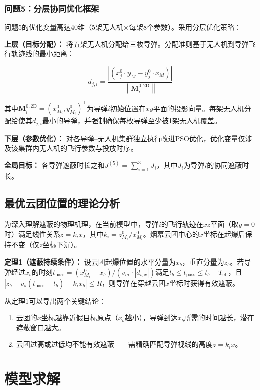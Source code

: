 \documentclass[12pt,a4paper]{ctexart}
\newcommand{\abs}[1]{\left| #1 \right|}
\newcommand{\norm}[1]{\left\| #1 \right\|}
\newcommand{\vect}[1]{\boldsymbol{#1}}
\begin{document}
\subsubsection{问题5：分层协同优化框架}

问题5的优化变量高达40维（5架无人机$\times$每架8个参数）。采用分层优化策略：

\textbf{上层（目标分配）：} 将五架无人机分配给三枚导弹。分配准则基于无人机到导弹飞行轨迹线的最小距离：

\begin{equation}\label{eq:assign}
d_{j,i} = \frac{\abs{(x_j^0 \cdot y_M - y_j^0 \cdot x_M)}}{\norm{\vect{M}_i^{0,\text{2D}}}}
\end{equation}

其中$\vect{M}_i^{0,\text{2D}} = (x_{M_i}^0, y_{M_i}^0)^\top$为导弹$i$初始位置在$xy$平面的投影向量。每架无人机分配给使其$d_{j,i}$最小的导弹，并强制确保每枚导弹至少被1架无人机覆盖。

\textbf{下层（参数优化）：} 对各导弹--无人机集群独立执行改进PSO优化，优化变量仅涉及该集群内无人机的飞行参数与投放时序。

\textbf{全局目标：} 各导弹遮蔽时长之和$J^{(5)} = \sum_{i=1}^{3} J_i$，其中$J_i$为导弹$i$的协同遮蔽时长。

\subsection{最优云团位置的理论分析}

为深入理解遮蔽的物理机理，在当前模型中，导弹$i$的飞行轨迹在$xz$平面（取$y=0$时）满足线性关系$z = k_i x$，其中$k_i = z_{M_i}^0 / x_{M_i}^0$。烟幕云团中心的$x$坐标在起爆后保持不变（仅$z$坐标下沉）。

\textbf{定理1（遮蔽持续条件）：} 设云团起爆位置的水平分量为$x_b$，垂直分量为$z_b$。若导弹经过$x_b$的时刻$t_{\text{pass}} = (x_{M_i}^0 - x_b)/(v_m \cdot |d_{i,x}|)$满足$t_b \leq t_{\text{pass}} \leq t_b + T_{\text{eff}}$，且$|z_b - v_s(t_{\text{pass}} - t_b) - k_i x_b| \leq R$，则导弹在穿越云团$x$坐标时获得有效遮蔽。

从定理1可以导出两个关键结论：
\begin{enumerate}
    \item 云团的$x$坐标越靠近假目标原点（$x_b$越小），导弹到达$x_b$所需的时间越长，潜在遮蔽窗口越大。
    \item 云团过高或过低均不能有效遮蔽——需精确匹配导弹视线的高度$z = k_i x$。
\end{enumerate}

\section{模型求解}
\end{document}
